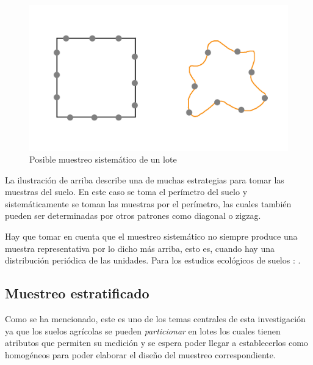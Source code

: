 \documentclass{report}
\begin{document}
\bigbreak

\begin{figure}[H]
    \centering
    \includegraphics[width=0.3\paperwidth]{img/soil-systematic-sampling.png}
    \caption{Posible muestreo sistemático de un lote}
\end{figure}

La ilustración de arriba describe una de muchas estrategias \cite{lassaga-2011} \cite{gobpe-ministerio-del-ambiente-2014} para tomar las muestras del suelo. En este caso se toma el perímetro del suelo y sistemáticamente se toman las muestras por el perímetro, las cuales también pueden ser determinadas por otros patrones como diagonal o zigzag.

\bigbreak

Hay que tomar en cuenta que el muestreo sistemático no siempre produce una muestra representativa por lo dicho más arriba, esto es, cuando hay una distribución periódica de las unidades. Para los estudios ecológicos de suelos \cite{lohr-2009}: .

\subsection{Muestreo estratificado}

Como se ha mencionado, este es uno de los temas centrales de esta investigación ya que los suelos agrícolas se pueden \textit{particionar} en lotes los cuales tienen atributos que permiten su medición y se espera poder llegar a establecerlos como homogéneos para poder elaborar el diseño del muestreo correspondiente.

\bigbreak
\end{document}
